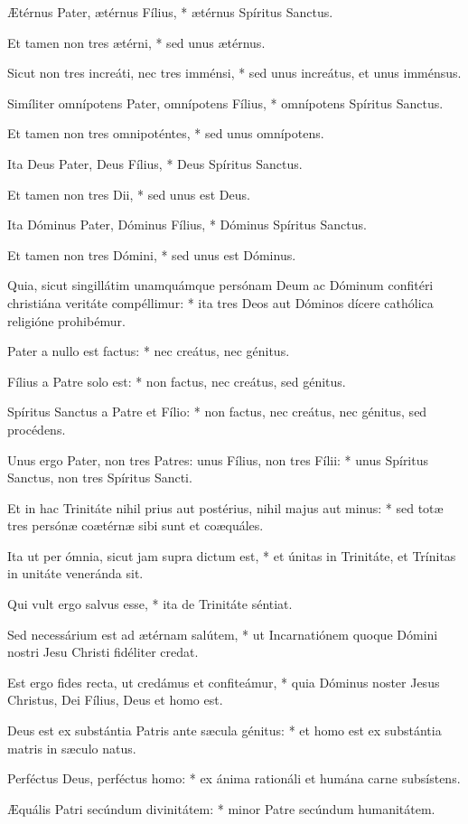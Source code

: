 Ætérnus Pater, ætérnus Fílius, * ætérnus Spíritus Sanctus.

Et tamen non tres ætérni, * sed unus ætérnus.

Sicut non tres increáti, nec tres imménsi, * sed unus increátus, et unus imménsus.

Simíliter omnípotens Pater, omnípotens Fílius, * omnípotens Spíritus Sanctus.

Et tamen non tres omnipoténtes, * sed unus omnípotens.

Ita Deus Pater, Deus Fílius, * Deus Spíritus Sanctus.

Et tamen non tres Dii, * sed unus est Deus.

Ita Dóminus Pater, Dóminus Fílius, * Dóminus Spíritus Sanctus.

Et tamen non tres Dómini, * sed unus est Dóminus.

Quia, sicut singillátim unamquámque persónam Deum ac Dóminum confitéri christiána veritáte compéllimur: * ita tres Deos aut Dóminos dícere cathólica religióne prohibémur.

Pater a nullo est factus: * nec creátus, nec génitus.

Fílius a Patre solo est: * non factus, nec creátus, sed génitus.

Spíritus Sanctus a Patre et Fílio: * non factus, nec creátus, nec génitus, sed procédens.

Unus ergo Pater, non tres Patres: unus Fílius, non tres Fílii: * unus Spíritus Sanctus, non tres Spíritus Sancti.

Et in hac Trinitáte nihil prius aut postérius, nihil majus aut minus: * sed totæ tres persónæ coætérnæ sibi sunt et coæquáles.

Ita ut per ómnia, sicut jam supra dictum est, * et únitas in Trinitáte, et Trínitas in unitáte veneránda sit.

Qui vult ergo salvus esse, * ita de Trinitáte séntiat.

Sed necessárium est ad ætérnam salútem, * ut Incarnatiónem quoque Dómini nostri Jesu Christi fidéliter credat.

Est ergo fides recta, ut credámus et confiteámur, * quia Dóminus noster Jesus Christus, Dei Fílius, Deus et homo est.

Deus est ex substántia Patris ante sæcula génitus: * et homo est ex substántia matris in sæculo natus.

Perféctus Deus, perféctus homo: * ex ánima rationáli et humána carne subsístens.

Æquális Patri secúndum divinitátem: * minor Patre secúndum humanitátem.

